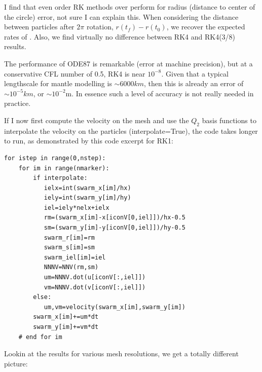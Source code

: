 I find that even order RK methods over perform for radius (distance to center of the circle) error, 
not sure I can explain this. When considering the distance between particles after $2\pi$ rotation, 
$r(t_f)-r(t_0)$, we recover the expected rates of \textcite{galh18}. 
Also, we find virtually no difference between RK4 and RK4(3/8) results.

The performance of ODE87 is remarkable (error at machine precision), but at a conservative 
CFL number of 0.5, RK4 is near $10^{-8}$. Given that a typical lengthscale for mantle modelling 
is $\sim 6000km$, then this is already an error of $\sim 10^{-5}km$, or $\sim 10^{-2}$m. 
In essence such a level of accuracy is not really needed in practice.

If I now first compute the velocity on the mesh and use the $Q_2$ basis functions to interpolate the 
velocity on the particles ({\python interpolate}=True), the code takes longer to run, as 
demonstrated by this code excerpt for RK1:
\begin{lstlisting}
for istep in range(0,nstep):
    for im in range(nmarker):
        if interpolate:
           ielx=int(swarm_x[im]/hx)
           iely=int(swarm_y[im]/hy)
           iel=iely*nelx+ielx
           rm=(swarm_x[im]-x[iconV[0,iel]])/hx-0.5
           sm=(swarm_y[im]-y[iconV[0,iel]])/hy-0.5
           swarm_r[im]=rm
           swarm_s[im]=sm
           swarm_iel[im]=iel
           NNNV=NNV(rm,sm)
           um=NNNV.dot(u[iconV[:,iel]])
           vm=NNNV.dot(v[iconV[:,iel]])
        else:
           um,vm=velocity(swarm_x[im],swarm_y[im])
        swarm_x[im]+=um*dt
        swarm_y[im]+=vm*dt
    # end for im
\end{lstlisting}

\newpage
Lookin at the results for various mesh resolutions, we get a totally different picture:

